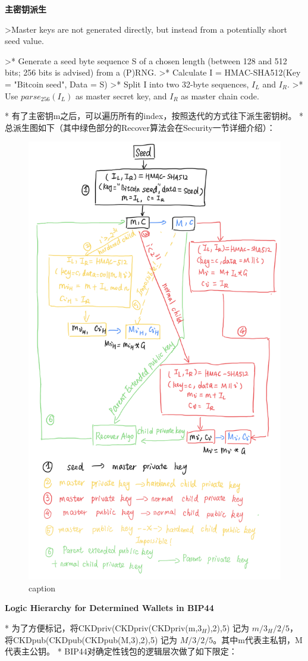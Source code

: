 \textbf{主密钥派生}

>Master keys are not generated directly, but instead from a potentially short seed value.

>* Generate a seed byte sequence S of a chosen length (between 128 and 512 bits; 256 bits is advised) from a (P)RNG.
>* Calculate I = HMAC-SHA512(Key = "Bitcoin seed", Data = S)
>* Split I into two 32-byte sequences, $I_L$ and $I_R$.
>* Use $parse_{256}(I_L)$ as master secret key, and $I_R$ as master chain code.
 
* 有了主密钥m之后，可以遍历所有的index，按照迭代的方式往下派生密钥树。
* 总派生图如下（其中绿色部分的Recover算法会在Security一节详细介绍）：

\begin{figure}[h]
\centering
\includegraphics[width=.7\textwidth]{./outline.png}
\caption{caption}\label{fig-parsesig}
\end{figure}

\textbf{Logic Hierarchy for Determined Wallets in BIP44}

* 为了方便标记，将CKDpriv(CKDpriv(CKDpriv(m,$3_H$),2),5) 记为 $m/3_H/2/5$，将CKDpub(CKDpub(CKDpub(M,3),2),5) 记为 $M/3/2/5$。其中m代表主私钥，M代表主公钥。
* BIP44对确定性钱包的逻辑层次做了如下限定：

